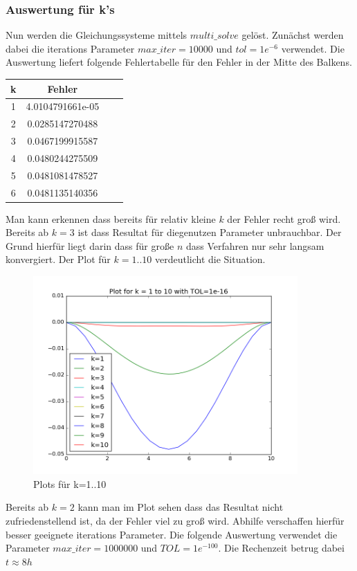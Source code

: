 \documentclass[12pt,titlepage]{article}
\begin{document}
	 	\subsubsection{Auswertung für k's}
	 		Nun werden die Gleichungssysteme mittels $multi\_solve$ gelöst. Zunächst werden dabei die iterations Parameter $max\_iter=10000$ und $tol=1e^{-6}$ verwendet. Die Auswertung liefert folgende Fehlertabelle für den Fehler in der Mitte des Balkens.	 		
			\begin{table}[!h]
				\centering
				\begin{tabular}{c c c c}
					\bf k & \bf Fehler\\
					\hline
					1	& 4.0104791661e-05 \\ 
					2   & 0.0285147270488 \\
					3	& 0.0467199915587 \\
					4	& 0.0480244275509\\
					5   & 0.0481081478527\\
					6	& 0.0481135140356\\
				\end{tabular}
			\end{table}
			Man kann erkennen dass bereits für relativ kleine $k$ der Fehler recht groß wird. Bereits ab $k=3$ ist dass Resultat für diegenutzen Parameter unbrauchbar. Der Grund hierfür liegt darin dass für große $n$ dass Verfahren nur sehr langsam konvergiert. Der Plot für $k=1..10$ verdeutlicht die Situation.
		 	\begin{figure}[H] 
	 			\centering
	 			\includegraphics[width=0.9\textwidth]{ks.png}
	 			\caption{Plots für k=1..10}
	 			\label{fig:Bild2}
	 		\end{figure}
	 		Bereits ab $k=2$ kann man im Plot sehen dass das Resultat nicht zufriedenstellend ist, da der Fehler viel zu groß wird. Abhilfe verschaffen hierfür besser geeignete iterations Parameter. Die folgende Auswertung verwendet die Parameter $max\_iter=1000000$ und $TOL = 1e^{-100}$. Die Rechenzeit betrug dabei $t \approx 8h$
\end{document}
